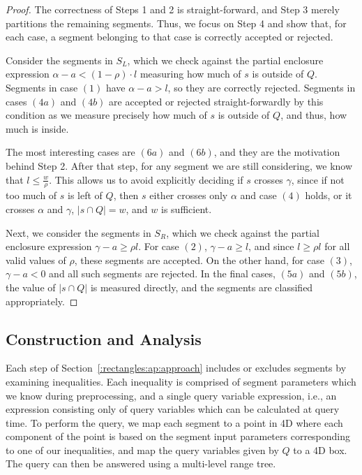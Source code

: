\begin{proof}
The correctness of Steps 1 and 2 is straight-forward, and Step 3 merely partitions the remaining segments. 
Thus, we focus on Step 4 and show that, for each case, a segment belonging to that case is correctly accepted or rejected.

Consider the segments in $S_L$, which we check against the partial enclosure expression $\alpha - a < (1 - \rho) \cdot l$ measuring how much of $s$ is outside of $Q$. 
Segments in case $(1)$ have $\alpha - a > l$, so they are correctly rejected. 
Segments in cases $(4a)$ and $(4b)$ are accepted or rejected straight-forwardly by this condition as we measure precisely how much of $s$ is outside of $Q$, and thus, how much is inside. 

The most interesting cases are $(6a)$ and $(6b)$, and they are the motivation behind Step 2.
After that step, for any segment we are still considering, we know that $l \leq \frac{w}{\rho}$. 
This allows us to avoid explicitly deciding if $s$ crosses $\gamma$, since if not too much of $s$ is left of $Q$, then $s$ either crosses only $\alpha$ and case $(4)$ holds, or it crosses $\alpha$ and $\gamma$, $|s \cap Q| = w$, and $w$ is sufficient.

Next, we consider the segments in $S_R$, which we check against the partial enclosure expression $\gamma - a \geq  \rho l$. 
For case $(2)$, $\gamma - a \geq l$, and since $l \geq \rho l$ for all valid values of $\rho$, these segments are accepted.
On the other hand, for case $(3)$, $\gamma - a < 0$ and all such segments are rejected. 
In the final cases, $(5a)$ and $(5b)$, the value of $|s \cap Q|$ is measured directly, and the segments are classified appropriately.

\end{proof}


\subsection{Construction and Analysis}
\label{:rectangles:ap:analysis}

Each step of Section~\ref{:rectangles:ap:approach} includes or excludes segments by examining inequalities.
Each inequality is comprised of segment parameters which we know during preprocessing, and a single query variable expression, i.e., an expression consisting only of query variables which can be calculated at query time. 
To perform the query, we map each segment to a point in 4D where each component of the point is based on the segment input parameters corresponding to one of our inequalities, and map the query variables given by $Q$ to a 4D box.
The query can then be answered using a multi-level range tree.

